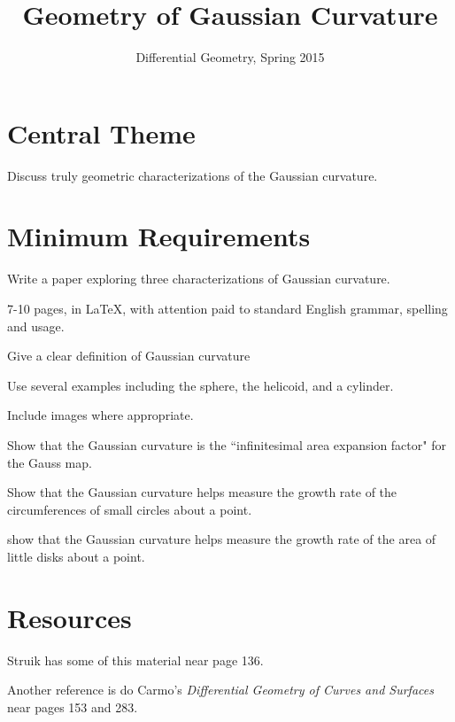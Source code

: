 \documentclass[12pt]{amsart}
\begin{document}
\title{Geometry of Gaussian Curvature}
\author{Differential Geometry, Spring 2015}

\maketitle

\section*{Central Theme}

Discuss truly geometric characterizations of the Gaussian curvature.

\section*{Minimum Requirements}

Write a paper exploring three characterizations of Gaussian curvature.
\begin{compactitem}
\item 7-10 pages, in \LaTeX, with attention paid to standard English grammar, spelling and usage.
\item Give a clear definition of Gaussian curvature
\item Use several examples including the sphere, the helicoid, and a cylinder.
\item Include images where appropriate.
\item Show that the Gaussian curvature is the ``infinitesimal area expansion factor" for the Gauss map.
\item Show that the Gaussian curvature helps measure the growth rate of the circumferences of small circles about a point.
\item show that the Gaussian curvature helps measure the growth rate of the area of little disks about a point.
\end{compactitem}

\section*{Resources}

Struik has some of this material near page 136.

Another reference is do Carmo's \emph{Differential Geometry of Curves and Surfaces} near pages 153 and 283.
\end{document}

